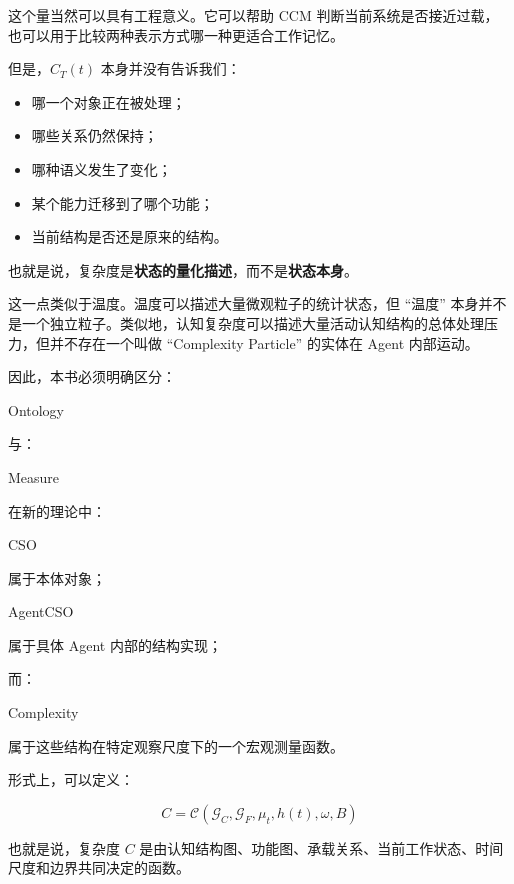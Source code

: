这个量当然可以具有工程意义。它可以帮助 CCM 判断当前系统是否接近过载，也可以用于比较两种表示方式哪一种更适合工作记忆。

但是，$C_T(t)$ 本身并没有告诉我们：

\begin{itemize}
    \item 哪一个对象正在被处理；
    \item 哪些关系仍然保持；
    \item 哪种语义发生了变化；
    \item 某个能力迁移到了哪个功能；
    \item 当前结构是否还是原来的结构。
\end{itemize}

也就是说，复杂度是\textbf{状态的量化描述}，而不是\textbf{状态本身}。

这一点类似于温度。温度可以描述大量微观粒子的统计状态，但 ``温度'' 本身并不是一个独立粒子。类似地，认知复杂度可以描述大量活动认知结构的总体处理压力，但并不存在一个叫做 ``Complexity Particle'' 的实体在 Agent 内部运动。

因此，本书必须明确区分：

\begin{statementbox}
Ontology
\end{statementbox}

与：

\begin{statementbox}
Measure
\end{statementbox}

在新的理论中：

\begin{statementbox}
CSO
\end{statementbox}

属于本体对象；

\begin{statementbox}
AgentCSO
\end{statementbox}

属于具体 Agent 内部的结构实现；

而：

\begin{statementbox}
Complexity
\end{statementbox}

属于这些结构在特定观察尺度下的一个宏观测量函数。

形式上，可以定义：

\[
C
=
\mathcal C(
\mathcal G_C,
\mathcal G_F,
\mu_t,
h(t),
\omega,
B
)
\]

也就是说，复杂度 $C$ 是由认知结构图、功能图、承载关系、当前工作状态、时间尺度和边界共同决定的函数。

